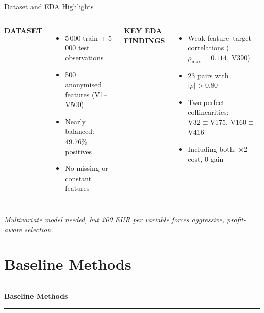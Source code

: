 \documentclass[aspectratio=169,10pt]{beamer}
\newcommand{\sectionslide}[1]{%
  \begin{frame}[plain]
    \centering\vfill
    \textcolor{mid}{\rule{0.10\textwidth}{0.3pt}}\par\vspace{0.5em}
    {\large\bfseries #1}\par\vspace{0.5em}
    \textcolor{mid}{\rule{0.10\textwidth}{0.3pt}}
    \vfill
  \end{frame}%
}
\newcommand{\slabel}[1]{\textbf{\tiny\MakeUppercase{#1}}\\[0.25em]}
\begin{document}
\begin{frame}{Dataset and EDA Highlights}
\begin{columns}[T]

\slabel{Dataset}
\begin{itemize}\itemsep2pt
  \item 5\,000 train + 5\,000 test observations
  \item 500 anonymised features (V1--V500)
  \item Nearly balanced: 49.76\% positives
  \item No missing or constant features
\end{itemize}


\slabel{Key EDA findings}
\begin{itemize}\itemsep2pt
  \item Weak feature--target correlations ($\rho_{\max}=0.114$, V390)
  \item 23 pairs with $|\rho|>0.80$
  \item Two perfect collinearities:\\
        V32$\equiv$V175, \; V160$\equiv$V416
  \item Including both: $\times$2 cost, 0 gain
\end{itemize}

\end{columns}

\vspace{0.4em}
{\footnotesize\itshape Multivariate model needed, but 200 EUR per variable forces aggressive, profit-aware selection.}
\end{frame}

\section{Baseline Methods}
\sectionslide{Baseline Methods}
\end{document}

